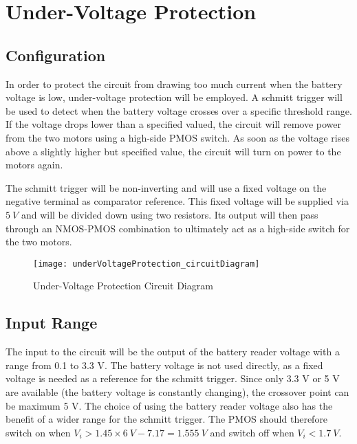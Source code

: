 \graphicspath{{content/2_design/figures/}}
\section{Under-Voltage Protection}

\subsection{Configuration}

In order to protect the circuit from drawing too much current when the battery voltage is low, under-voltage protection will be employed.
A schmitt trigger will be used to detect when the battery voltage crosses over a specific threshold range. If the voltage
drops lower than a specified valued, the circuit will remove power from the two motors using a high-side PMOS switch. As soon as
the voltage rises above a slightly higher but specified value, the circuit will turn on power to the motors again.

The schmitt trigger will be non-inverting and will use a fixed voltage on the negative terminal as comparator reference.
This fixed voltage will be supplied via $\SI{5}{V}$ and will be divided down using two resistors. Its output will then pass through
an NMOS-PMOS combination to ultimately act as a high-side switch for the two motors.

\begin{figure}[!htb]
  \centering
  \texttt{[image: underVoltageProtection\_circuitDiagram]}
  \caption{Under-Voltage Protection Circuit Diagram}
  \label{fig:underVoltageProtection_circuitDiagram}
\end{figure}

\subsection{Input Range}

The input to the circuit will be the output of the battery reader voltage with a range from 0.1 to 3.3 V. The battery voltage is not used directly,
as a fixed voltage is needed as a reference for the schmitt trigger. Since only 3.3 V or 5 V are available (the battery voltage is constantly changing),
the crossover point can be maximum 5 V. The choice of using the battery reader voltage also has the benefit of a wider range for the schmitt trigger.
The PMOS should therefore switch on when $V_i > 1.45 \times \SI{6}{V} - 7.17 = \SI{1.555}{V}$ and switch off when $V_i < \SI{1.7}{V}$.

